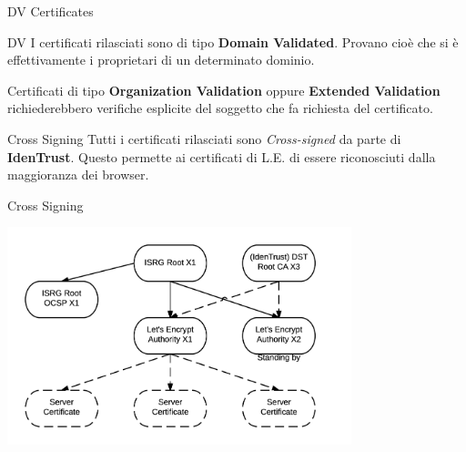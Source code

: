 \documentclass[xcolor=svgnames,11pt]{beamer}
\begin{document}
\begin{frame}{DV Certificates}
\begin{block}{DV}
I certificati rilasciati sono di tipo \textbf{Domain Validated}. Provano cioè
che si è effettivamente i proprietari di un determinato dominio.
\end{block}
\medskip\pause

Certificati di tipo \textbf{Organization Validation} oppure \textbf{Extended Validation}
richiederebbero verifiche esplicite del soggetto che fa richiesta del certificato.

\end{frame}

\begin{frame}{Cross Signing}
Tutti i certificati rilasciati sono \emph{Cross-signed} da parte di \textbf{IdenTrust}.
Questo permette ai certificati di L.E. di essere riconosciuti dalla maggioranza dei browser.

\medskip

\end{frame}

\begin{frame}{Cross Signing}
\begin{center}
\includegraphics[width=10cm]{img/certs.png}
\end{center}
\end{frame}
\end{document}
